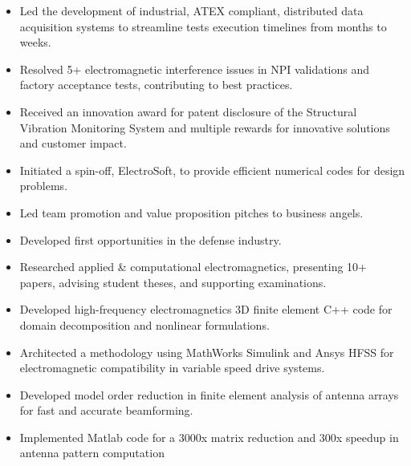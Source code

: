 \documentclass[9pt,a4paper,ragged2e,withhyper]{altacv} %
\begin{document}
\begin{paracol}{2}
\begin{itemize}
\item Led the development of industrial, ATEX compliant, distributed data acquisition
systems to streamline tests execution timelines from months to weeks.
\item Resolved 5+ electromagnetic interference issues in NPI validations and factory
acceptance tests, contributing to best practices.
\item Received an innovation award for patent disclosure of the Structural Vibration
Monitoring System and multiple rewards for innovative solutions and customer impact.
\end{itemize}
\divider

\begin{itemize}
\item Initiated a spin-off, ElectroSoft, to provide efficient numerical codes for design problems.
\item Led team promotion and value proposition pitches to business angels.
\item Developed first opportunities in the defense industry.
\end{itemize}
\divider

\begin{itemize}
\item Researched applied \& computational electromagnetics, presenting 10+ papers, advising student theses, and supporting examinations.
\item Developed high-frequency electromagnetics 3D finite element C++ code for domain decomposition and nonlinear formulations.
\item Architected a methodology using MathWorks Simulink and Ansys HFSS for electromagnetic compatibility in variable speed drive systems.
\end{itemize}
\divider

\begin{itemize}
\item Developed model order reduction in finite element analysis of antenna arrays for fast and accurate beamforming.
\item Implemented Matlab code for a 3000x matrix reduction and 300x speedup in antenna pattern computation
\end{itemize}
\divider


\end{paracol}
\end{document}
